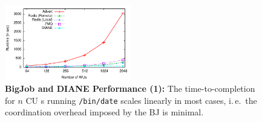\documentclass[conference,final]{IEEEtran}
\makeatletter
\def\reduwave{\bgroup \markoverwith{\lower3.5\p@\hbox{\sixly \textcolor{red}{\char58}}}\ULon}
\newcommand{\jwave}[1]{ {\reduwave{#1}}}
\newcommand{\jhanote}[1]{ {\textcolor{red} { ***shantenu: #1 }}}
\newcommand{\alnote}[1]{ {\textcolor{blue} { ***andre: #1 }}}
\newcommand{\jwave}[1]{#1}
\newcommand{\alnote}[1]{}
\newcommand{\jhanote}[1]{}
\newcommand{\cu}{CU\xspace}
\newcommand{\upp}{\vspace*{-0.5em}}
\makeatother
\begin{document}






\begin{figure}[htbp] \centering
\includegraphics[width=0.49\textwidth]{perf/bigjob-varying-wus-alamo.pdf}
\caption{\textbf{BigJob and DIANE Performance (1):} The 
time-to-completion for $n$ \cu s running \texttt{/bin/date} scales linearly
in most cases, i.\,e.\ the coordination overhead imposed by the BJ is 
minimal.\upp\upp}
\label{fig:perf_bigjob-varying-wus} \end{figure}
\end{document}
